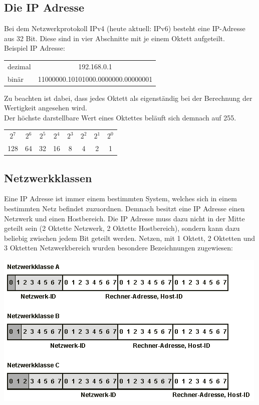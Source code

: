 \documentclass[12pt,a4paper]{article}
\begin{document}
		\newpage
		\subsection{Die IP Adresse}
			Bei dem Netzwerkprotokoll IPv4 (heute aktuell: IPv6) besteht eine IP-Adresse aus 32 Bit. Diese sind in vier Abschnitte mit je einem Oktett aufgeteilt.\\
			Beispiel IP Adresse:
			\begin{center}
				\renewcommand{\arraystretch}{1.5}
				\begin{tabularx}{10cm}{lc}
					dezimal&192.168.0.1 \\
					binär&11000000.10101000.0000000.00000001 \\
				\end{tabularx}
			\end{center}
			Zu beachten ist dabei, dass jedes Oktett als eigenständig bei der Berechnung der Wertigkeit angesehen wird.\\ Der höchste darstellbare Wert eines Oktettes beläuft sich demnach auf 255.
			\begin{center}
				\renewcommand{\arraystretch}{1.5}
				\begin{tabularx}{6cm}{cccccccc}
					$2^7$&$2^6$&$2^5$&$2^4$&$2^3$&$2^2$&$2^1$&$2^0$ \\
					128&64&32&16&8&4&2&1 \\
				\end{tabularx}
			\end{center}
		
		\subsection{Netzwerkklassen}
			Eine IP Adresse ist immer einem bestimmten System, welches sich in einem bestimmten Netz befindet zuzuordnen. Demnach besitzt eine IP Adresse einen Netzwerk und einen Hostbereich. Die IP Adresse muss dazu nicht in der Mitte geteilt sein (2 Oktette Netzwerk, 2 Oktette Hostbereich), sondern kann dazu beliebig zwischen jedem Bit geteilt werden. Netzen, mit 1 Oktett, 2 Oktetten und 3 Oktetten Netzwerkbereich wurden besondere Bezeichnungen zugewiesen:
			\begin{center}
				\includegraphics[scale=0.7]{Bilder/Netzwerkklassen.png}
			\end{center}
		
\end{document}
